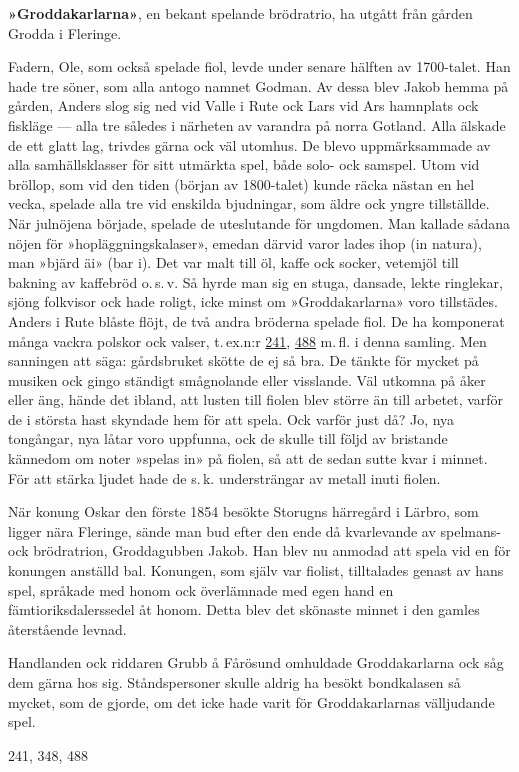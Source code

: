 \textbf{»Groddakarlarna»}, en bekant spelande brödratrio, ha utgått från gården Grodda i Fleringe. 

Fadern, Ole, som också spelade fiol, levde under senare hälften av 1700-talet. Han hade tre söner, som alla antogo namnet Godman. Av dessa blev Jakob hemma på gården, Anders slog sig ned vid Valle i Rute ock Lars vid Ars hamnplats ock fiskläge --- alla tre således i närheten av varandra på norra Gotland. Alla älskade de ett glatt lag, trivdes gärna ock väl utomhus. De blevo uppmärksammade av alla samhällsklasser för sitt utmärkta spel, både solo- ock samspel. Utom vid bröllop, som vid den tiden (början av 1800-talet) kunde räcka nästan en hel vecka, spelade alla tre vid enskilda bjudningar, som äldre ock yngre tillställde. När julnöjena började, spelade de uteslutande för ungdomen. Man kallade sådana nöjen för »hopläggningskalaser», emedan därvid varor lades ihop (in natura), man »bjärd äi» (bar i). Det var malt till öl, kaffe ock socker, vetemjöl till bakning av kaffebröd o.\,s.\,v\@. Så hyrde man sig en stuga, dansade, lekte ringlekar, sjöng folkvisor ock hade roligt, icke minst om »Groddakarlarna» voro tillstädes. Anders i Rute blåste flöjt, de två andra bröderna spelade fiol. De ha komponerat många vackra polskor ock valser, t.\,ex.\@ n:r \href{241}{241}, \href{488}{488} m.\,fl. i denna samling. Men sanningen att säga: gårdsbruket skötte de ej så bra. De tänkte för mycket på musiken ock gingo ständigt smågnolande eller visslande. Väl utkomna på åker eller äng, hände det ibland, att lusten till fiolen blev större än till arbetet, varför de i största hast skyndade hem för att spela. Ock varför just då? Jo, nya tongångar, nya låtar voro uppfunna, ock de skulle till följd av bristande kännedom om noter »spelas in» på fiolen, så att de sedan sutte kvar i minnet. För att stärka ljudet hade de s.\,k. understrängar av metall inuti fiolen. 

När konung Oskar den förste 1854 besökte Storugns härregård i Lärbro, som ligger nära Fleringe, sände man bud efter den ende då kvarlevande av spelmans- ock brödratrion, Groddagubben Jakob. Han blev nu anmodad att spela vid en för konungen anställd bal. Konungen, som själv var fiolist, tilltalades genast av hans spel, språkade med honom ock överlämnade med egen hand en fämtioriksdalerssedel åt honom. Detta blev det skönaste minnet i den gamles återstående levnad. 

Handlanden ock riddaren Grubb å Fårösund omhuldade Groddakarlarna ock såg dem gärna hos sig. Ståndspersoner skulle aldrig ha besökt bondkalasen så mycket, som de gjorde, om det icke hade varit för Groddakarlarnas välljudande spel.

241, 348, 488 
